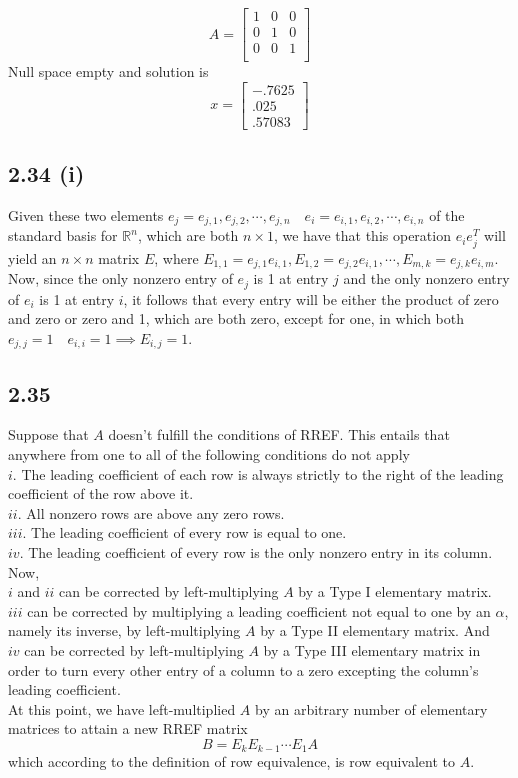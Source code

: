 \documentclass[letterpaper,12pt]{article}
\theoremstyle{definition}
\begin{document}
\[A =
\begin{bmatrix}
    1 & 0 & 0 \\
    0 & 1 & 0 \\
    0 & 0 & 1 \\
\end{bmatrix}
\]
Null space empty and solution is
\[x =
\begin{bmatrix}
    -.7625\\
    .025\\
    .57083
\end{bmatrix}\]

\subsection*{2.34 (i)}
Given these two elements $e_j = {e_{j,1}, e_{j,2}, \cdots, e_{j,n}} \quad e_i = {e_{i,1}, e_{i,2}, \cdots, e_{i,n}}$ of the standard basis for $\mathbb{R} ^n$, which are both $n \times 1$, we have that this operation $e_ie_j^T$ will yield an $n \times n$ matrix $E$, where $E_{1,1} = e_{j,1}e_{i,1}, E_{1,2} = e_{j,2}e_{i,1}, \cdots, E_{m,k} = e_{j,k}e_{i,m}$. Now, since the only nonzero entry of $e_j$ is 1 at entry $j$ and the only nonzero entry of $e_i$ is 1 at entry $i$, it follows that every entry will be either the product of zero and zero or zero and 1, which are both zero, except for one, in which both $e_{j,j} = 1 \quad e_{i,i} = 1 \implies E_{i,j} = 1$.

\subsection*{2.35}
Suppose that $A$ doesn't fulfill the conditions of RREF. This entails that anywhere from one to all of the following conditions do not apply
\\$i$. The leading coefficient of each row is always strictly to the right of the leading coefficient of the row above it.
\\$ii$. All nonzero rows are above any zero rows.
\\$iii$. The leading coefficient of every row is equal to one.
\\$iv$. The leading coefficient of every row is the only nonzero entry in its column. 
Now, \\$i$ and $ii$ can be corrected by left-multiplying $A$ by a Type I elementary matrix. \\$iii$ can be corrected by multiplying a leading coefficient not equal to one by an $\alpha$, namely its inverse, by left-multiplying $A$ by a Type II elementary matrix. And \\$iv$ can be corrected by left-multiplying $A$ by a Type III elementary matrix in order to turn every other entry of a column to a zero excepting the column's leading coefficient.
\\At this point, we have left-multiplied $A$ by an arbitrary number of elementary matrices to attain a new RREF matrix \[B = E_kE_{k-1}\cdots E_1A\]which according to the definition of row equivalence, is row equivalent to $A$. 
\end{document}
